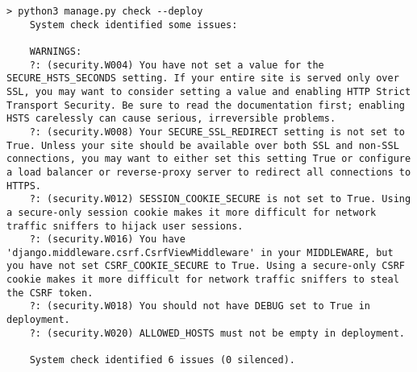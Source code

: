 \begin{lstlisting}[keywordstyle=\color{black},caption={Warnings shown by Django check deploy command on fresh project},breaklines=true,label={lst:djangoCheckDeploy}]
    > python3 manage.py check --deploy
    System check identified some issues:
    
    WARNINGS:
    ?: (security.W004) You have not set a value for the SECURE_HSTS_SECONDS setting. If your entire site is served only over SSL, you may want to consider setting a value and enabling HTTP Strict Transport Security. Be sure to read the documentation first; enabling HSTS carelessly can cause serious, irreversible problems.
    ?: (security.W008) Your SECURE_SSL_REDIRECT setting is not set to True. Unless your site should be available over both SSL and non-SSL connections, you may want to either set this setting True or configure a load balancer or reverse-proxy server to redirect all connections to HTTPS.
    ?: (security.W012) SESSION_COOKIE_SECURE is not set to True. Using a secure-only session cookie makes it more difficult for network traffic sniffers to hijack user sessions.
    ?: (security.W016) You have 'django.middleware.csrf.CsrfViewMiddleware' in your MIDDLEWARE, but you have not set CSRF_COOKIE_SECURE to True. Using a secure-only CSRF cookie makes it more difficult for network traffic sniffers to steal the CSRF token.
    ?: (security.W018) You should not have DEBUG set to True in deployment.
    ?: (security.W020) ALLOWED_HOSTS must not be empty in deployment.
    
    System check identified 6 issues (0 silenced).
\end{lstlisting}
